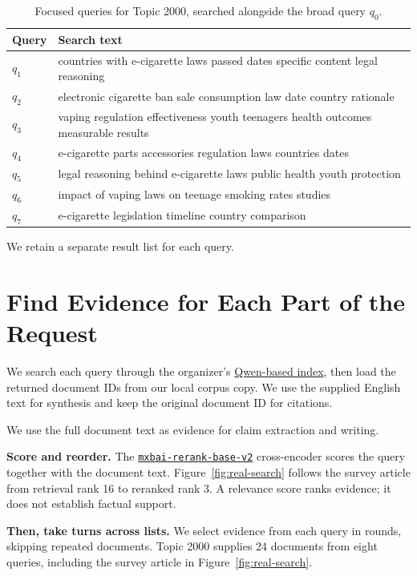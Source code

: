\documentclass[11pt,letterpaper]{article}
\begin{document}
\begin{table}[!ht]
\small\centering
\begin{tabularx}{\linewidth}{@{}lX@{}}
\toprule
Query & Search text\\\midrule
$q_1$ & countries with e-cigarette laws passed dates specific content legal reasoning\\
$q_2$ & electronic cigarette ban sale consumption law date country rationale\\
$q_3$ & vaping regulation effectiveness youth teenagers health outcomes measurable results\\
$q_4$ & e-cigarette parts accessories regulation laws countries dates\\
$q_5$ & legal reasoning behind e-cigarette laws public health youth protection\\
$q_6$ & impact of vaping laws on teenage smoking rates studies\\
$q_7$ & e-cigarette legislation timeline country comparison\\\bottomrule
\end{tabularx}
\caption{Focused queries for Topic 2000, searched alongside the broad query $q_0$.}
\label{tab:facets}
\end{table}

We retain a separate result list for each query.

\section{Find Evidence for Each Part of the Request}
We search each query through the organizer's \href{https://huggingface.co/Qwen/Qwen3-Embedding-8B}{\textcolor{sea}{Qwen-based index}}, then load the returned document IDs from our local corpus copy. We use the supplied English text for synthesis and keep the original document ID for citations.

We use the full document text as evidence for claim extraction and writing.

\textbf{Score and reorder.} The \href{https://huggingface.co/mixedbread-ai/mxbai-rerank-base-v2}{\textcolor{sea}{\texttt{mxbai-rerank-base-v2}}} cross-encoder scores the query together with the document text. Figure~\ref{fig:real-search} follows the survey article from retrieval rank 16 to reranked rank 3. A relevance score ranks evidence; it does not establish factual support.

\textbf{Then, take turns across lists.} We select evidence from each query in rounds, skipping repeated documents. Topic 2000 supplies 24 documents from eight queries, including the survey article in Figure~\ref{fig:real-search}.
\end{document}
